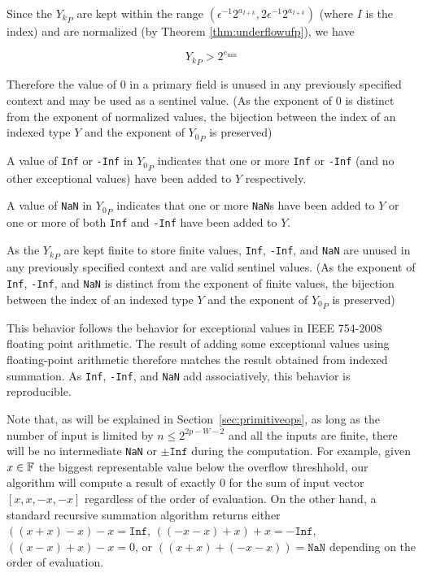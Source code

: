       Since the ${Y_k}_P$ are kept within the range
      \(
      	(\epsilon^{-1}  2^{a_{I + k}}, 2 \epsilon^{-1} 2^{a_{I + k}})
      \) (where $I$ is the index) and are
      normalized (by Theorem \ref{thm:underflowufp}), we have

      \begin{equation*}
        {Y_k}_P > 2^{e_{\min}}
      \end{equation*}

      Therefore the value of $0$ in a primary field is unused in any previously
      specified context and may be used as a sentinel value. (As the exponent
      of $0$ is distinct from the exponent of normalized values, the bijection
      between the index of an indexed type $Y$ and the exponent of ${Y_0}_P$ is
      preserved)

      A value of \texttt{Inf} or \texttt{-Inf} in ${Y_0}_P$ indicates that one or more \texttt{Inf} or \texttt{-Inf} (and no other exceptional values) have been added to $Y$ respectively.

      A value of \texttt{NaN} in ${Y_0}_P$ indicates that one or more \texttt{NaN}s have been added to $Y$ or one or more of both \texttt{Inf} and \texttt{-Inf} have been added to $Y$.

      As the ${Y_k}_P$ are kept finite to store finite values, \texttt{Inf}, \texttt{-Inf}, and \texttt{NaN} are unused in any previously specified context and are valid sentinel values. (As the exponent of \texttt{Inf}, \texttt{-Inf}, and \texttt{NaN} is distinct from the exponent of finite values, the bijection between the index of an indexed type $Y$ and the exponent of ${Y_0}_P$ is preserved)

      This behavior follows the behavior for exceptional values in IEEE
      754-2008 floating point arithmetic. The result of adding some exceptional
      values using floating-point arithmetic therefore matches the result
      obtained from indexed summation. As \texttt{Inf}, \texttt{-Inf}, and
      \texttt{NaN} add associatively, this behavior is reproducible.

      Note that, as will be explained in Section~\ref{sec:primitiveops},
      as long as the number of input is limited by $n \leq 2^{2p-W-2}$
      and all the inputs are finite, there will be no intermediate \texttt{NaN}
      or $\pm \texttt{Inf}$ during the computation.
      For example, given $x \in \mathbb{F}$ the biggest representable value below the
      overflow threshhold, our algorithm will compute a result of exactly $0$ for
      the sum of input vector $[x,x,-x,-x]$ regardless of the order of evaluation.
      On the other hand, a standard recursive summation algorithm returns either
      $((x+x)-x)-x=\texttt{Inf}$, $((-x-x)+x)+x=-\texttt{Inf}$, $((x-x)+x)-x = 0$, 
      or $((x + x) + (-x-x)) = \texttt{NaN}$ depending on the order of evaluation.

